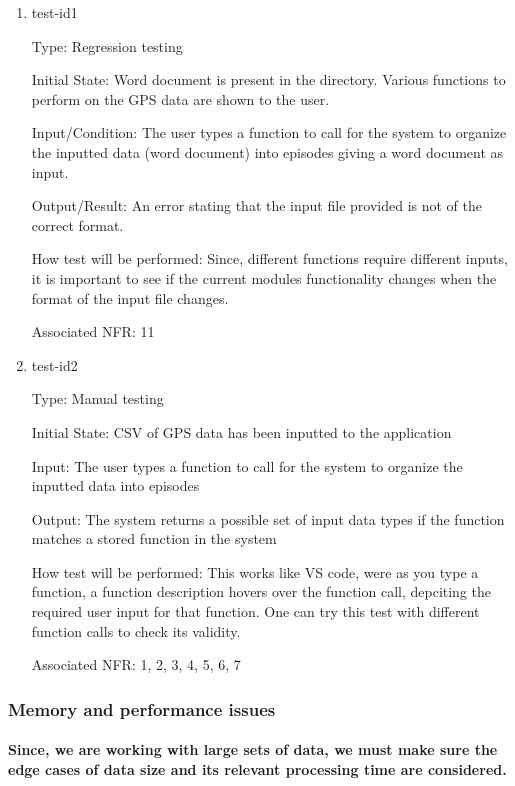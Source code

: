 \documentclass[12pt, titlepage]{article}
\begin{document}
\begin{enumerate}

\item{test-id1\\}

Type: Regression testing
					
Initial State: Word document is present in the directory. Various functions to perform on the GPS data are shown to the user.
					
Input/Condition: The user types a function to call for the system to organize the
inputted data (word document) into episodes giving a word document as input. 
					
Output/Result: An error stating that the input file provided is not of the correct format.
					
How test will be performed: Since, different functions require different inputs, it is important to see if the current modules functionality changes when the format of the input file changes.

Associated NFR: 11
\item{test-id2\\}

Type: Manual testing
					
Initial State: CSV of GPS data has been inputted to the application
					
Input: The user types a function to call for the system to organize the
inputted data into episodes
					
Output: The system returns a possible set of input data types if the function matches a stored function in the system
					
How test will be performed: This works like VS code, were as you type a function, a function description hovers over the function call, depciting the required user input for that function. One can try this test with different function calls to check its validity.

Associated NFR: 1, 2, 3, 4, 5, 6, 7 
\end{enumerate}

\subsubsection{Memory and performance issues}
\paragraph{Since, we are working with large sets of data, we must make sure the edge cases of data size and its relevant processing time are considered. }
\end{document}
